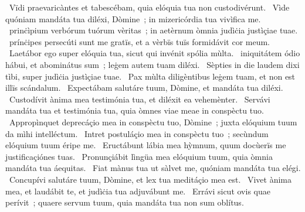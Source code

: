 {~Vïdi praevaricàntes et tabescébam, quia elóquia tua non custodivérunt. 
~Vìde quóniam mandáta tua diléxi, Dòmine~; in mizericórdia tua vivìfica me. 
~prinċìpium verbórum tuórum vèritas~; in aetèrnum òmnia judìċia justìçiae tuae. 
~prínċipes persecúti sunt me gratïs, et a vèrbïs tuïs formidávit cor meum. 
~Laetábor ego super elóquia tua, sicut qui invénit spólia mùlta. 
~iniquitátem ódio hábui, et abominátus sum~; leġem autem tuam diléxi. 
~Sèpties in die laudem dixi tìbi, super judìċia justìçiae tuae. 
~Pax mùlta diligèntibus leġem tuam, et non est illïs scándalum. 
~Expectábam salutáre tuum, Dòmine, et mandáta tua diléxi. 
~Custodívit ànima mea testimónia tua, et diléxit ea vehemènter. 
~Servávi mandáta tua et testimónia tua, quia òmnes viae meae in conspèctu tuo. 
~Appropìnquet deprecáçio mea in conspèctu tuo, Dòmine~; juxta elóquium tuum da mìhi intelléctum. 
~Intret postuláçio mea in conspèctu tuo~; secùndum elóquium tuum éripe me. 
~Eructábunt lábia mea hỳmnum, quum docùerïs me justificaçiónes tuas. 
~Pronunçiábit lìngüa mea elóquium tuum, quia òmnia mandáta tua áequitas. 
~Fiat mànus tua ut sàlvet me, quóniam mandáta tua elégi. 
~Concupívi salutáre tuum, Dòmine, et lex tua meditáçio mea est. 
~Vivet ànima mea, et laudábit te, et judìċia tua adjuvábunt me. 
~Errávi sicut ovis quae perívit~; quaere servum tuum, quia mandáta tua non sum oblítus. 
}
